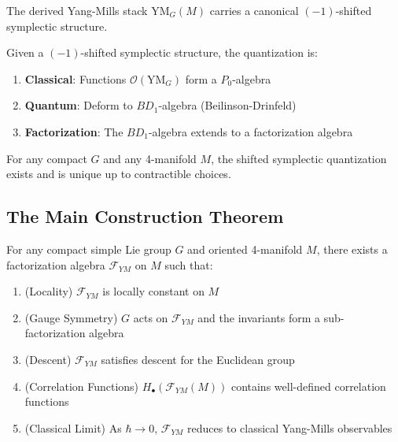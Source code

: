 \begin{theorem}[PTVV]
The derived Yang-Mills stack $\text{YM}_G(M)$ carries a canonical $(-1)$-shifted symplectic structure.
\end{theorem}

\begin{construction}
Given a $(-1)$-shifted symplectic structure, the quantization is:
\begin{enumerate}
    \item \textbf{Classical}: Functions $\mathcal{O}(\text{YM}_G)$ form a $P_0$-algebra
    \item \textbf{Quantum}: Deform to $BD_1$-algebra (Beilinson-Drinfeld)
    \item \textbf{Factorization}: The $BD_1$-algebra extends to a factorization algebra
\end{enumerate}
\end{construction}

\begin{theorem}
For any compact $G$ and any 4-manifold $M$, the shifted symplectic quantization exists and is unique up to contractible choices.
\end{theorem}

\subsection{The Main Construction Theorem}

\begin{theorem}\label{thm:main-homotopy}
For any compact simple Lie group $G$ and oriented 4-manifold $M$, there exists a factorization algebra $\mathcal{F}_{YM}$ on $M$ such that:
\begin{enumerate}
    \item (Locality) $\mathcal{F}_{YM}$ is locally constant on $M$
    \item (Gauge Symmetry) $G$ acts on $\mathcal{F}_{YM}$ and the invariants form a sub-factorization algebra
    \item (Descent) $\mathcal{F}_{YM}$ satisfies descent for the Euclidean group
    \item (Correlation Functions) $H_\bullet(\mathcal{F}_{YM}(M))$ contains well-defined correlation functions
    \item (Classical Limit) As $\hbar \to 0$, $\mathcal{F}_{YM}$ reduces to classical Yang-Mills observables
\end{enumerate}
\end{theorem}

